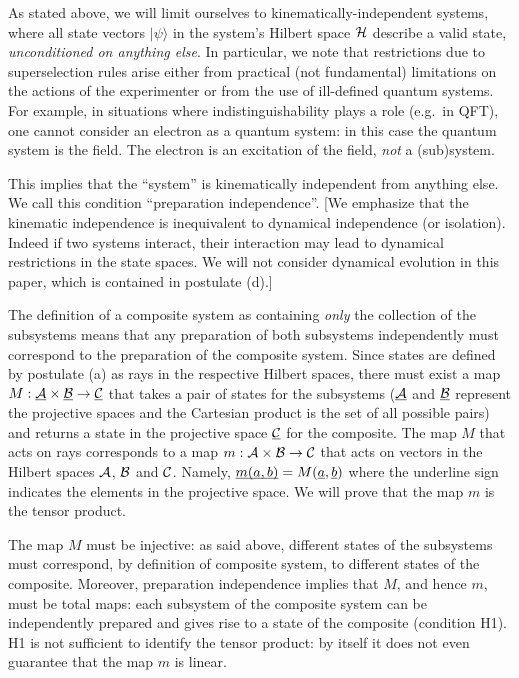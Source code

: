 \documentclass[aps,prl,amsmath,amssymb,twocolumn,nofootinbib]{revtex4}
\theoremstyle{plain}
\theoremstyle{definition}
\theoremstyle{remark}
\newcommand{\pj}[1] {\underbar{$#1$}}
\def\>{\rangle}
\begin{document}
  As stated
above, we will limit ourselves to kinematically-independent systems,
where all state vectors $|\psi\>$ in the system's Hilbert space $\cal H$
describe a valid state, {\em unconditioned on anything else}. In
particular, we note that restrictions due to superselection rules
arise either from practical (not fundamental) limitations on the
actions of the experimenter \cite{susskind,zanardi,zanardilloyd} or
from the use of ill-defined quantum systems. For example, in
situations where indistinguishability plays a role (e.g.~in QFT), one
cannot consider an electron as a quantum system: in this case the
quantum system is the field. The electron is an excitation of the
field, {\em not} a (sub)system.

This implies that the ``system'' is kinematically independent from
anything else.  We call this condition ``preparation independence''.
[We emphasize that the kinematic independence is inequivalent to
dynamical independence (or isolation).  Indeed if two systems
interact, their interaction may lead to dynamical restrictions in the
state spaces. We will not consider dynamical evolution in this paper,
which is contained in postulate (d).]

The definition of a composite system as containing {\em only} the
collection of the subsystems means that any preparation of both
subsystems independently must correspond to the preparation of the
composite system. Since states are defined by postulate (a) as rays in
the respective Hilbert spaces, there must exist a map $M : \pj{\cal A}
\times \pj{\cal B } \to \pj{\cal C}$ that takes a pair of states for
the subsystems ($\pj{\cal A}$ and $\pj{\cal B }$ represent the
projective spaces and the Cartesian product is the set of all possible
pairs) and returns a state in the projective space $\pj{\cal C}$ for
the composite. The map $M$ that acts on rays corresponds to a map $m:{\cal A}\times{\cal B}\to{\cal C}$ that
acts on vectors in the Hilbert spaces $\cal A$, $\cal B$ and $\cal C$.
Namely, $\pj{m(a,b)}=M(\pj{a},\pj{b})$ where the underline sign
indicates the elements in the projective space. We will prove that the
map $m$ is the tensor product.

The map $M$ must be injective: as said above, different states of the
subsystems must correspond, by definition of composite system, to
different states of the composite. Moreover, preparation independence
implies that $M$, and hence $m$, must be total maps: each subsystem of
the composite system can be independently prepared and gives rise to a
state of the composite (condition H1).  H1 is not sufficient
to identify the tensor product: by itself it does not even guarantee
that the map $m$ is linear.
\end{document}

